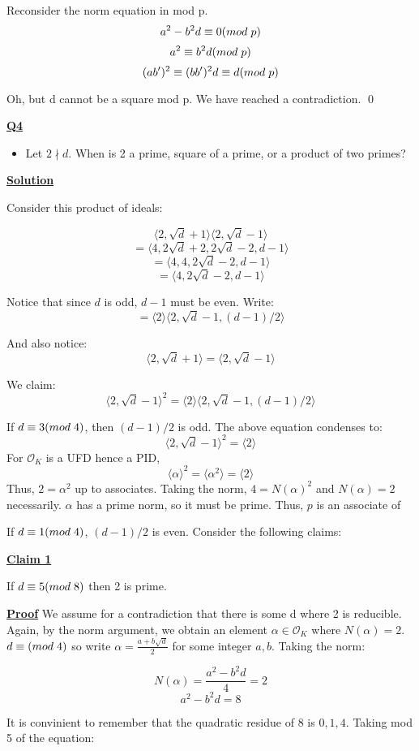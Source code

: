 \documentclass{article}
\newcommand{\new}[1]{
    \vspace{2mm}
    \noindent
    \textbf{
    \underline{#1}}
}
\def\_{{\hspace{1mm}}}
\newcommand{\Proof}{{
    \vspace{2mm}
    \noindent
    \textbf{
    \underline{Proof}}
}
}
\newcommand{\<}{{{
    \langle
}}}
\def\>{{{
    \rangle
}}}
\newcommand{\ringInt}{
    {\mathcal{O}}
}
\begin{document}
Reconsider the norm equation in mod p. 
\[
    a^2 - b^2d \equiv 0 (mod\_p)
\]
\[
    a^2 \equiv b^2d (mod\_p)
\]
\[
    (ab')^2 \equiv (bb')^2d \equiv d (mod\_p)
\]

Oh, but d cannot be a square mod p. We have reached a contradiction.
\qed

\newpage
\new{Q4}



\begin{itemize}
    \item Let $2 \nmid d$. When is 2 a prime, square of a prime, or a product of two primes?
\end{itemize}



\new{Solution}

Consider this product of ideals:

\[
    \<2, \sqrt{d}+1\>\<2, \sqrt{d} - 1\>\]\[
    =\<4, 2\sqrt{d}+2, 2\sqrt{d} - 2, d-1\>
\]
\[
    = \<4, 4, 2\sqrt{d}-2, d-1\>
\]
\[
    = \<4, 2\sqrt{d}-2, d-1\>
\]

Notice that since $d$ is odd, $d-1$ must be even. Write:
\[
    = \<2\>\<2, \sqrt{d}-1, (d-1)/2\>
\]

And also notice:
\[
     \<2, \sqrt{d}+1\> = \<2, \sqrt{d} - 1\>
\]

We claim:
\[
     \<2, \sqrt{d} - 1\>^2 = \<2\>\<2, \sqrt{d}-1, (d-1)/2\>
\]

If $d \equiv 3 (mod\_4)$, then $(d-1)/2$ is odd. The above equation 
condenses to:
\[
    \<2, \sqrt{d} - 1\>^2 = \<2\>
\]
For $\ringInt_K$ is a UFD hence a PID, 
\[
    \<\alpha\>^2 = \<\alpha^2\> = \<2\>
\]
Thus, $2 = \alpha^2$ up to associates. Taking the norm, 
$4 = N(\alpha)^2$ and $N(\alpha) = 2$ necessarily. $\alpha$ has 
a prime norm, so it must be prime. Thus, $p$ is an associate of 


If $d \equiv 1(mod\_4)$, $(d-1)/2$ is even. 
Consider the following claims:


\new{Claim 1}
If $d \equiv 5 (mod\_8)$ then 2 is prime. 

\Proof We assume for a contradiction that there is some d where 
2 is reducible. Again, by the norm argument, we obtain an 
element $\alpha \in \ringInt_K$ where $N(\alpha) = 2$. 
$d \equiv (mod\_4)$ so write $\alpha = \frac{a+b\sqrt{d}}{2}$
for some integer $a, b$. Taking the norm:

\[
    N(\alpha) = \frac{a^2-b^2d}{4} = 2
\]
\[
    a^2-b^2d = 8
\]

It is convinient to remember that the quadratic residue of 
8 is $0, 1, 4$. Taking mod 5 of the equation:
\end{document}
